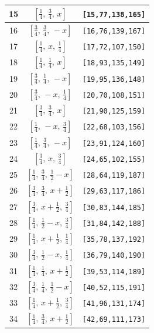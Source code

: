 \documentclass[fleqn,8pt]{jsarticle}
\begin{document}
\begin{longtable}{ccc}
15 & $\left[ \frac{1}{4},\, \frac{3}{4},\, x \right]$ & {\tt [15,77,138,165]} \\ \hline
16 & $\left[ \frac{3}{4},\, \frac{3}{4},\, - x \right]$ & {\tt [16,76,139,167]} \\ \hline
17 & $\left[ \frac{1}{4},\, x,\, \frac{1}{4} \right]$ & {\tt [17,72,107,150]} \\ \hline
18 & $\left[ \frac{1}{4},\, \frac{1}{4},\, x \right]$ & {\tt [18,93,135,149]} \\ \hline
19 & $\left[ \frac{3}{4},\, \frac{1}{4},\, - x \right]$ & {\tt [19,95,136,148]} \\ \hline
20 & $\left[ \frac{3}{4},\, - x,\, \frac{1}{4} \right]$ & {\tt [20,70,108,151]} \\ \hline
21 & $\left[ \frac{3}{4},\, \frac{3}{4},\, x \right]$ & {\tt [21,90,125,159]} \\ \hline
22 & $\left[ \frac{1}{4},\, - x,\, \frac{3}{4} \right]$ & {\tt [22,68,103,156]} \\ \hline
23 & $\left[ \frac{1}{4},\, \frac{3}{4},\, - x \right]$ & {\tt [23,91,124,160]} \\ \hline
24 & $\left[ \frac{3}{4},\, x,\, \frac{3}{4} \right]$ & {\tt [24,65,102,155]} \\ \hline
25 & $\left[ \frac{1}{4},\, \frac{3}{4},\, \frac{1}{2} - x \right]$ & {\tt [28,64,119,187]} \\ \hline
26 & $\left[ \frac{3}{4},\, \frac{3}{4},\, x + \frac{1}{2} \right]$ & {\tt [29,63,117,186]} \\ \hline
27 & $\left[ \frac{3}{4},\, x + \frac{1}{2},\, \frac{3}{4} \right]$ & {\tt [30,83,144,185]} \\ \hline
28 & $\left[ \frac{1}{4},\, \frac{1}{2} - x,\, \frac{3}{4} \right]$ & {\tt [31,84,142,188]} \\ \hline
29 & $\left[ \frac{1}{4},\, x + \frac{1}{2},\, \frac{1}{4} \right]$ & {\tt [35,78,137,192]} \\ \hline
30 & $\left[ \frac{3}{4},\, \frac{1}{2} - x,\, \frac{1}{4} \right]$ & {\tt [36,79,140,190]} \\ \hline
31 & $\left[ \frac{1}{4},\, \frac{1}{4},\, x + \frac{1}{2} \right]$ & {\tt [39,53,114,189]} \\ \hline
32 & $\left[ \frac{3}{4},\, \frac{1}{4},\, \frac{1}{2} - x \right]$ & {\tt [40,52,115,191]} \\ \hline
33 & $\left[ \frac{1}{4},\, x + \frac{1}{2},\, \frac{3}{4} \right]$ & {\tt [41,96,131,174]} \\ \hline
34 & $\left[ \frac{1}{4},\, \frac{3}{4},\, x + \frac{1}{2} \right]$ & {\tt [42,69,111,173]} \\ \hline

\end{longtable}
\end{document}
